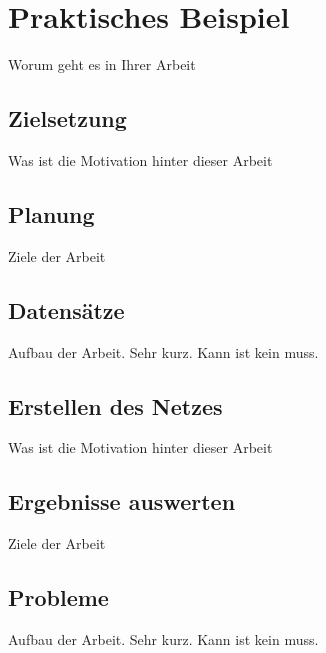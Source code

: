 \chapter{Praktisches Beispiel}
\label{chap:praktischesBeispiel}
Worum geht es in Ihrer Arbeit

\section{Zielsetzung}
\label{sec:zielsetzung}
Was ist die Motivation hinter dieser Arbeit

\section{Planung}
\label{sec:planung}
Ziele der Arbeit

\section{Datens\"atze}
\label{sec:datensaetze}
Aufbau der Arbeit. Sehr kurz. Kann ist kein muss.

\section{Erstellen des Netzes}
\label{sec:erstellenDesNetzes}
Was ist die Motivation hinter dieser Arbeit

\section{Ergebnisse auswerten}
\label{sec:ergebnisseAuswerten}
Ziele der Arbeit

\section{Probleme}
\label{sec:probleme}
Aufbau der Arbeit. Sehr kurz. Kann ist kein muss. 